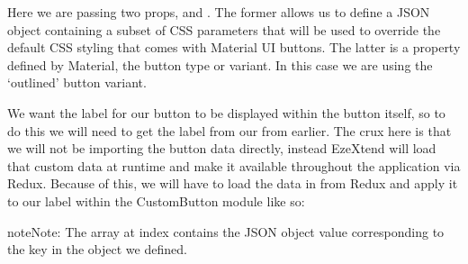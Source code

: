 \documentclass[letterpaper,10pt,english]{sphinxmanual}
\begin{document}
\sphinxAtStartPar
Here we are passing two props,  and . The former allows us to define a JSON object containing a subset of CSS parameters that will be used to override the default CSS styling that comes with Material UI buttons. The latter is a property defined by Material, the button type or variant. In this case we are using the ‘outlined’ button variant.

\sphinxAtStartPar
We want the label for our button to be displayed within the button itself, so to do this we will need to get the label from our  from earlier. The crux here is that we will not be importing the button data directly, instead EzeXtend will load that custom data at runtime and make it available throughout the application via Redux. Because of this, we will have to load the data in from Redux and apply it to our label within the CustomButton module like so:

\begin{sphinxadmonition}{note}{Note:}
\sphinxAtStartPar
The array  at index  contains the JSON object value corresponding to the  key in the  object we defined.
\end{sphinxadmonition}

%
\begin{sphinxVerbatim}[commandchars=\\\{\},numbers=left,firstnumber=1,stepnumber=1]
    

      
        \PYG{p}{[}\PYG{p}{]}

    
           
           
\end{sphinxVerbatim}
\sphinxresetverbatimhllines
\end{document}
